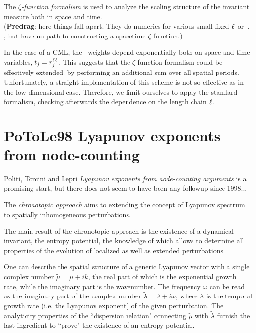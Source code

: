 \begin{description}
The \emph{$\zeta$‐function formalism} is used to analyze the scaling
structure of the invariant measure both in space and time.
\\
(\textbf{Predrag}: here things fall apart. They do numerics for various
small fixed ${\ell_{}}$ or $\period{}$, but have no path to constructing
a spacetime $\zeta$‐function.)

In the case of a CML, the \po\ weights depend exponentially both on space
and time variables, $t_j=r_j^{{\ell_{}}{\ell_{}}}$. This suggests that
the $\zeta$‐function formalism could be effectively extended, by
performing an additional sum over all spatial periods. Unfortunately, a
straight implementation of this scheme is not so effective as in the
low-dimensional case. Therefore, we limit ourselves to apply the standard
formalism, checking afterwards the dependence on the length chain
${\ell_{}}$.


\end{description}

\section{PoToLe98 {Lyapunov} exponents from node-counting}
\label{sect:PoToLe98}

\begin{description}

\item
Politi, Torcini and Lepri
{\em {Lyapunov} exponents from node-counting arguments}
is a promising start, but there does not seem to have been any followup
since 1998...

\end{description}

The \emph{chronotopic approach} aims to extending the concept of Lyapunov
spectrum to spatially inhomogeneous perturbations.

The main result of the chronotopic approach is the existence of a
dynamical invariant, the entropy potential, the knowledge of which allows
to determine all properties of the evolution of localized as well as
extended perturbations.

One can describe the spatial structure of a generic Lyapunov vector with
a single complex number \(\tilde{\mu}= \mu+ik\), the real part of which
is the exponential growth rate, while the imaginary part is the
wavenumber. The frequency $\omega$ can be read as the imaginary part of
the complex number \(\tilde{\lambda}= \lambda+i\omega\), where $\lambda$
is the temporal growth rate (i.e. the Lyapunov exponent) of the given
perturbation. The analyticity properties of the ``dispersion relation"
connecting $\tilde{\mu}$ with $\tilde{\lambda}$ furnish the last
ingredient to ``prove" the existence of an entropy potential.

